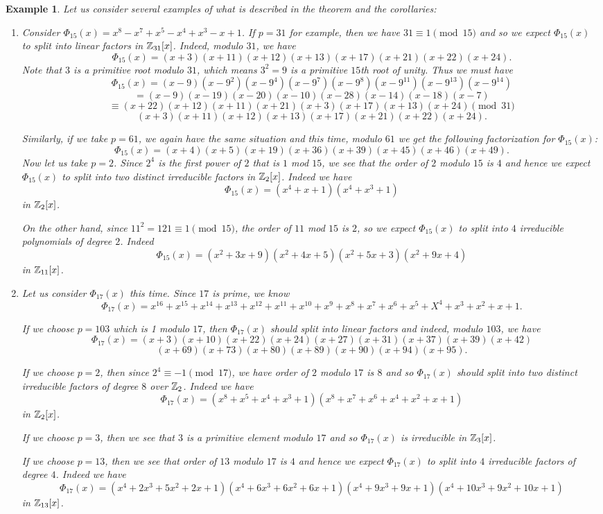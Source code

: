\documentclass[12pt]{article}
\theoremstyle{plain}
\newtheorem{example}{Example}
\theoremstyle{definition}
\theoremstyle{remark}
\begin{document}
\begin{example}
Let us consider several examples of what is described in the theorem and the corollaries:
\begin{enumerate}
    \item Consider $\Phi_{15}(x) = x^8-x^7+x^5-x^4+x^3-x+1$.
    If $p=31$ for example, then we have $31\equiv 1\pmod{15}$ and so we expect $\Phi_{15}(x)$ to split into linear factors in $\mathbb{Z}_{31}[x]$. Indeed, modulo $31$, we have 
    $$\Phi_{15}(x) = (x+3)(x+11)(x+12)(x+13)(x+17)(x+21)(x+22)(x+24). $$
    Note that $3$ is a primitive root modulo $31$, which means $3^2=9$ is a primitive $15$th root of unity. Thus we must have
    $$\Phi_{15}(x) = (x-9)(x-9^2)(x-9^4)(x-9^7)(x-9^8)(x-9^{11})(x-9^{13})(x-9^{14})$$
    $$=(x-9)(x-19)(x-20)(x-10)(x-28)(x-14)(x-18)(x-7)$$
    $$\equiv (x+22)(x+12)(x+11)(x+21)(x+3)(x+17)(x+13)(x+24) \pmod{31}$$
    $$(x+3)(x+11)(x+12)(x+13)(x+17)(x+21)(x+22)(x+24).$$
    
    Similarly, if we take $p=61$, we again have the same situation and this time, modulo $61$ we get the following factorization for $\Phi_{15}(x)$:
    $$\Phi_{15}(x)=(x+4)(x+5)(x+19)(x+36)(x+39)(x+45)(x+46)(x+49).$$
Now let us take $p=2$. Since $2^4$ is the first power of $2$ that is $1$ mod $15$, we see that the order of $2$ modulo $15$ is $4$ and hence we expect $\Phi_{15}(x)$ to split into two distinct irreducible factors in $\mathbb{Z}_2[x]$. Indeed we have 
$$\Phi_{15}(x) = (x^4+x+1)(x^4+x^3+1)$$ in $\mathbb{Z}_2[x]$. 

On the other hand, since $11^2=121\equiv 1 \pmod{15}$, the order of $11$ mod $15$ is $2$, so we expect $\Phi_{15}(x)$ to split into $4$ irreducible polynomials of degree $2$. Indeed 
$$\Phi_{15}(x) = (x^2+3x+9)(x^2+4x+5)(x^2+5x+3)(x^2+9x+4)$$
in $\mathbb{Z}_{11}[x]$. 

\item Let us consider $\Phi_{17}(x)$ this time. Since $17$ is prime, we know 
$$\Phi_{17}(x) = x^{16}+x^{15}+x^{14}+x^{13}+x^{12}+x^{11}+x^{10}+x^{9}+x^8+x^7+x^6+x^5+X^4+x^3+x^2+x+1.$$

If we choose $p=103$ which is 1 modulo $17$, then $\Phi_{17}(x)$ should split into linear factors and indeed, modulo $103$, we have
$$\Phi_{17}(x) = (x+3)(x+10)(x+22)(x+24)(x+27)(x+31)(x+37)(x+39)(x+42)$$
$$(x+69)(x+73)(x+80)(x+89)(x+90)(x+94)(x+95).$$

If we choose $p=2$, then since $2^4\equiv-1\pmod{17}$, we have order of $2$ modulo $17$ is $8$ and so $\Phi_{17}(x)$ should split into two distinct irreducible factors of degree $8$ over $\mathbb{Z}_2$. Indeed we have 
$$\Phi_{17}(x) = (x^8+x^5+x^4+x^3+1)(x^8+x^7+x^6+x^4+x^2+x+1)$$
in $\mathbb{Z}_2[x]$. 

If we choose $p=3$, then we see that $3$ is a primitive element modulo $17$ and so $\Phi_{17}(x)$ is irreducible in $\mathbb{Z}_{3}[x]$. 

If we choose $p=13$, then we see that order of $13$ modulo $17$ is $4$ and hence we expect $\Phi_{17}(x)$ to split into $4$ irreducible factors of degree $4$. Indeed we have 
$$\Phi_{17}(x) = (x^4+2x^3+5x^2+2x+1)(x^4+6x^3+6x^2+6x+1)(x^4+9x^3+9x+1)(x^4+10x^3+9x^2+10x+1)$$ in $\mathbb{Z}_{13}[x]$. 
\end{enumerate}
\end{example}
\end{document}
